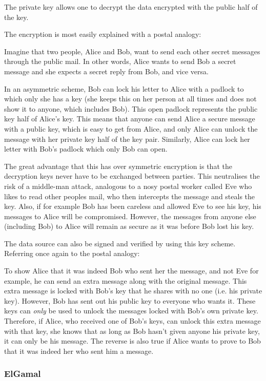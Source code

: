The private key allows one to decrypt the data encrypted with the public half of the key.

The encryption is most easily explained with a postal analogy:

Imagine that two people, Alice and Bob, want to send each other secret messages through
the public mail. In other words, Alice wants to send Bob a secret message and she expects
a secret reply from Bob, and vice versa. 

In an asymmetric scheme, Bob can lock his letter to Alice with a padlock to which only she has
a key (she keeps this on her person at all times and does not show it to anyone, which
includes Bob). This open padlock represents the public key half of Alice's key. This
means that anyone can send Alice a secure message with a public key, which is easy to
get from Alice, and only Alice can unlock the message with her private key half of the
key pair. Similarly, Alice can lock her letter with Bob's padlock which only Bob can open.

The great advantage that this has over symmetric encryption is that the decryption keys never
have to be exchanged between parties. This neutralises the risk of a middle-man attack,
analogous to a nosy postal worker called Eve who likes to read other peoples mail, who
then intercepts the message and steals the key.
Also, if for example Bob has been careless and allowed Eve to see his key, his messages to
Alice will be compromised. However, the messages from anyone else (including Bob) to Alice will
remain as secure as it was before Bob lost his key.

The data source can also be signed and verified by using this key scheme. Referring once again
to the postal analogy:

To show Alice that it was indeed Bob who sent her the message, and not Eve for example, he can
send an extra message along with the original message. This extra message is locked with Bob's
key that he shares with no one (i.e. his private key). However, Bob has sent out his
public key to everyone who wants it. These keys can \emph{only} be used to unlock
the messages locked with Bob's own private key. Therefore, if Alice, who received one of Bob's keys, can unlock this extra
message with that key, she knows that as long as Bob hasn't given anyone his private key, it
can only be his message. The reverse is also true if Alice wants to prove to Bob that it was
indeed her who sent him a message. 

\subsubsection{ElGamal}
\label{sec:elgamal}

